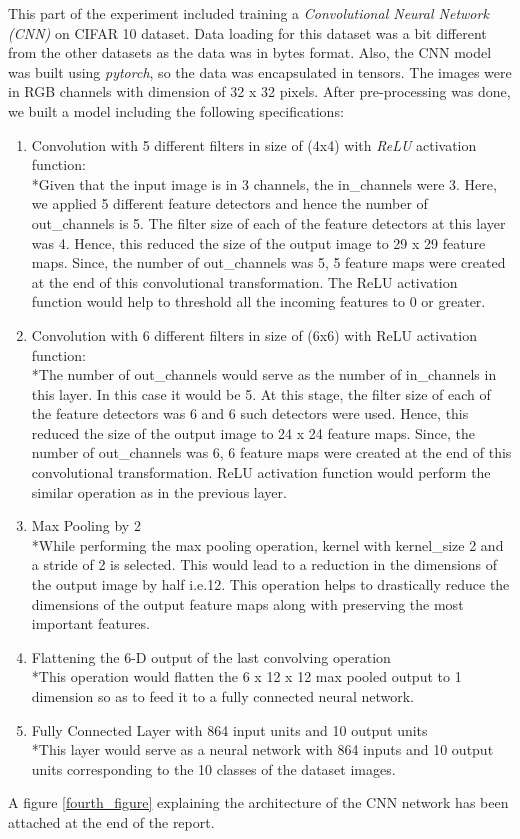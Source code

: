 \documentclass[10pt,twocolumn,letterpaper]{article}
\begin{document}
This part of the experiment included training a \textit{Convolutional Neural Network (CNN)} on CIFAR 10 dataset. Data loading for this dataset was a bit different from the other datasets as the data was in bytes format. Also, the CNN model was built using \textit{pytorch}, so the data was encapsulated in tensors. The images were in RGB channels with dimension of 32 x 32 pixels. 
After pre-processing was done, we built a model including the following specifications:
\begin{enumerate}
\item Convolution with 5 different filters in size of (4x4) with \textit{ReLU} activation function:
\\*Given that the input image is in 3 channels, the in\_channels were 3. Here, we applied 5 different feature detectors and hence the number of out\_channels is 5. The filter size of each of the feature detectors at this layer was 4. Hence, this reduced the size of the output image to 29 x 29 feature maps. Since, the number of out\_channels was 5, 5 feature maps were created at the end of this convolutional transformation. The ReLU activation function would help to threshold all the incoming features to 0 or greater.
\item Convolution with 6 different filters in size of (6x6) with ReLU activation function:
\\*The number of out\_channels would serve as the number of in\_channels in this layer. In this case it would be 5. At this stage, the filter size of each of the feature detectors was 6 and 6 such detectors were used. Hence, this reduced the size of the output image to 24 x 24 feature maps. Since, the number of out\_channels was 6, 6 feature maps were created at the end of this convolutional transformation. ReLU activation function would perform the similar operation as in the previous layer.
\item Max Pooling by 2
\\*While performing the max pooling operation, kernel with kernel\_size 2 and a stride of 2 is selected. This would lead to a reduction in the dimensions of the output image by half i.e.12. This operation helps to drastically reduce the dimensions of the output feature maps along with preserving the most important features.
\item Flattening the 6-D output of the last convolving operation
\\*This operation would flatten the 6 x 12 x 12 max pooled output to 1 dimension so as to feed it to a fully connected neural network.
\item Fully Connected Layer with 864 input units and 10 output units
\\*This layer would serve as a neural network with 864 inputs and 10 output units corresponding to the 10 classes of the dataset images.
\end{enumerate}
A figure \ref{fourth_figure} explaining the architecture of the CNN network has been attached at the end of the report.
\end{document}
